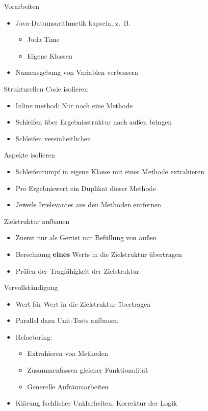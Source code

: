 \begin{frame}[t,fragile]{Vorarbeiten}
\begin{itemize}
\item Java-Datumsarithmetik kapseln, z.~B.
\begin{itemize}
\item Joda Time
\item Eigene Klassen
\end{itemize}
\item Namensgebung von Variablen verbessern
\end{itemize}
\end{frame}

\begin{frame}[t,fragile]{Strukturellen Code isolieren}
\begin{itemize}
\item Inline method: Nur noch eine Methode
\item Schleifen über Ergebnisstruktur nach außen bringen
\item Schleifen vereinheitlichen
\end{itemize}
\end{frame}

\begin{frame}[t,fragile]{Aspekte isolieren}
\begin{itemize}
\item Schleifenrumpf in eigene Klasse mit einer Methode extrahieren
\item Pro Ergebniswert ein Duplikat dieser Methode
\item Jeweils Irrelevantes aus den Methoden entfernen
\end{itemize}
\end{frame}

\begin{frame}[t,fragile]{Zielstruktur aufbauen}
\begin{itemize}
\item Zuerst nur als Gerüst mit Befüllung von außen
\item Berechnung \textbf{eines} Werts in die Zielstruktur übertragen
\item Prüfen der Tragfähigkeit der Zielstruktur
\end{itemize}
\end{frame}

\begin{frame}[t,fragile]{Vervollständigung}
\begin{itemize}
\item Wert für Wert in die Zielstruktur übertragen
\item Parallel dazu Unit-Tests aufbauen
\item Refactoring: 
\begin{itemize}
\item Extrahieren von Methoden
\item Zusammenfassen gleicher Funktionalität
\item Generelle Aufräumarbeiten
\end{itemize}
\item Klärung fachlicher Unklarheiten, Korrektur der Logik
\end{itemize}
\end{frame}

